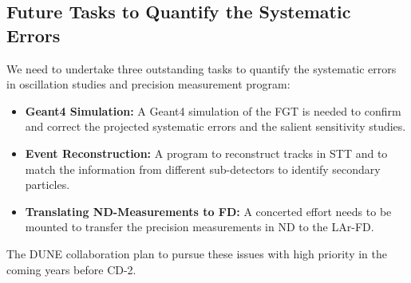 \subsection{Future Tasks to Quantify the Systematic Errors}
\label{cdrsec:detectors-nd-ref-fgt-req-future} 

We need to undertake three outstanding tasks to quantify the
systematic errors in oscillation studies and precision measurement
program:
\begin{itemize}
    \item {\bf Geant4 Simulation:} A Geant4 simulation of the FGT is
      needed to confirm and correct the projected systematic errors
      and the salient sensitivity studies.
     \item {\bf Event Reconstruction:} A program to reconstruct tracks
       in STT and to match the information from different
       sub-detectors to identify secondary particles.
     \item {\bf Translating ND-Measurements to FD:} A concerted effort
       needs to be mounted to transfer the precision measurements in
       ND to the LAr-FD.
\end{itemize}    
The DUNE collaboration plan to pursue these issues with high priority
in the coming years before CD-2.
